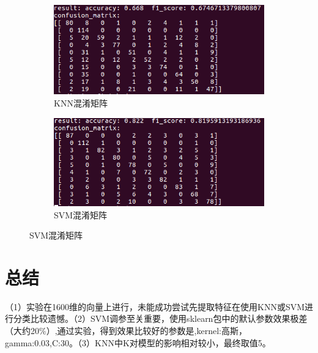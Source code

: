 \documentclass[a4paper]{article}
\begin{document}
        \begin{figure}[htbp]
            \centering
            \begin{subfigure}[b]{0.4\textwidth}
                \includegraphics[width=\textwidth]{./images/confusion_matrix_knn.png}
                \caption{KNN混淆矩阵}
            \end{subfigure}
            \begin{subfigure}[b]{0.4\textwidth}
                \includegraphics[width=\textwidth]{./images/confusion_matrix_svm.png}
                \caption{SVM混淆矩阵}
            \end{subfigure}
            
            \label{fig:confusion_matrix}
        \end{figure}

    \section{总结}

    （1）实验在1600维的向量上进行，未能成功尝试先提取特征在使用KNN或SVM进行分类比较遗憾。（2）SVM调参至关重要，使用sklearn包中的默认参数效果极差（大约20\%）,通过实验，得到效果比较好的参数是,kernel:高斯，gamma:0.03,C:30。（3）KNN中K对模型的影响相对较小，最终取值5。
\end{document}
